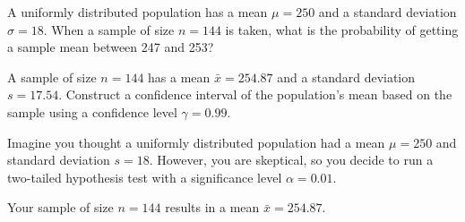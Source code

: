 \documentclass[12pt,letterpaper,addpoints]{exam}
\begin{document}
\begin{questions}
\question[10] A uniformly distributed population has a mean $\mu=250$ and a standard deviation $\sigma=18$. When a sample of size $n=144$ is taken, what is the probability of getting a sample mean between 247 and 253?
\newpage
\blankpage

\question[10] A sample of size $n=144$ has a mean $\bar{x}=254.87$ and a standard deviation $s=17.54$. Construct a confidence interval of the population's mean based on the sample using a confidence level $\gamma=0.99$.

\newpage
\blankpage

\question[10] Imagine you thought a uniformly distributed population had a mean $\mu=250$ and standard deviation $s=18$. However, you are skeptical, so you decide to run a two-tailed hypothesis test with a significance level $\alpha=0.01$.

Your sample of size $n=144$ results in a mean $\bar{x}=254.87$. 



\newpage
\blankpage
\end{questions}







\end{document}
